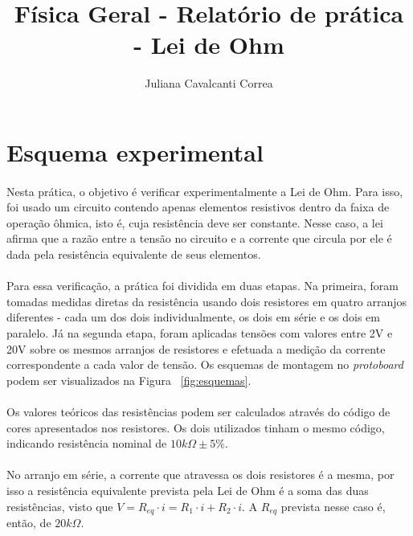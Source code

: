 \documentclass[11pt,a4paper]{article}
\title{Física Geral - Relatório de prática - Lei de Ohm}
\author{Juliana Cavalcanti Correa}
\begin{document}
   
  \maketitle

  \section{Esquema experimental}
  \label{sec:esquema}
    
    \paragraph{}
    Nesta prática, o objetivo é verificar experimentalmente a Lei de Ohm. Para isso, foi usado  um circuito contendo apenas elementos resistivos dentro da faixa de operação ôhmica, isto é, cuja resistência deve ser constante. Nesse caso, a lei afirma que a razão entre a tensão no circuito e a corrente que circula por ele é dada pela resistência equivalente de seus elementos.
    \paragraph{}
    Para essa verificação, a prática foi dividida em duas etapas. Na primeira, foram tomadas medidas diretas da resistência usando dois resistores em quatro arranjos diferentes - cada um dos dois individualmente, os dois em série e os dois em paralelo. Já na segunda etapa, foram aplicadas tensões com valores entre 2V e 20V sobre os mesmos arranjos de resistores e efetuada a medição da corrente correspondente a cada valor de tensão. Os esquemas de montagem no \textit{protoboard} podem ser visualizados na Figura ~\ref{fig:esquemas}.
    \paragraph{}
    Os valores teóricos das resistências podem ser calculados através do código de cores apresentados nos resistores. Os dois utilizados tinham o mesmo código, indicando resistência nominal de $10k\Omega\pm 5\%$. 
    \paragraph{}
    No arranjo em série, a corrente que atravessa os dois resistores é a mesma, por isso a resistência equivalente prevista pela Lei de Ohm é a soma das duas resistências, visto que $V = R_{eq} \cdot i = R_{1} \cdot i + R_{2} \cdot i$. A $R_{eq}$ prevista nesse caso é, então, de $20k\Omega$.
\end{document}
